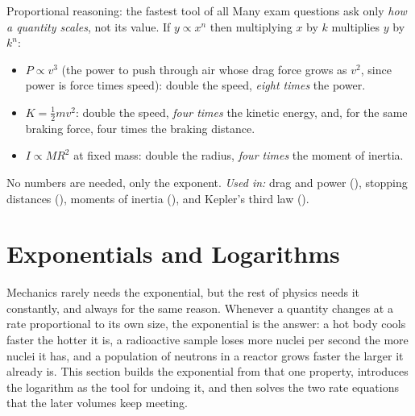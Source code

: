 \begin{methodbox}{Proportional reasoning: the fastest tool of all}
Many exam questions ask only \emph{how a quantity scales}, not its value. If $y\propto x^{n}$ then
multiplying $x$ by $k$ multiplies $y$ by $k^{n}$:
\begin{itemize}
\item $P\propto v^{3}$ (the power to push through air whose drag force grows as $v^2$, since power is
      force times speed): double the speed, \emph{eight times} the power.
\item $K=\tfrac12mv^{2}$: double the speed, \emph{four times} the kinetic energy, and, for the same
      braking force, four times the braking distance.
\item $I\propto MR^{2}$ at fixed mass: double the radius, \emph{four times} the moment of inertia.
\end{itemize}
No numbers are needed, only the exponent. \emph{Used in:} drag and power (), stopping
distances (), moments of inertia (), and Kepler's third law
().
\end{methodbox}

\section{Exponentials and Logarithms}\label{sec:explog}

Mechanics rarely needs the exponential, but the rest of physics needs it constantly, and always for the
same reason. Whenever a quantity changes at a rate proportional to its own size, the exponential is the
answer: a hot body cools faster the hotter it is, a radioactive sample loses more nuclei per second the
more nuclei it has, and a population of neutrons in a reactor grows faster the larger it already is.
This section builds the exponential from that one property, introduces the logarithm as the tool for
undoing it, and then solves the two rate equations that the later volumes keep meeting.

